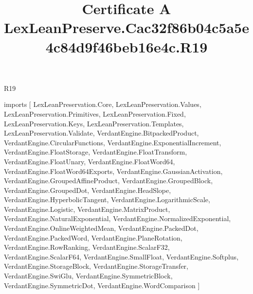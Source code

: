 \begin{lexlean}{R19}
\title{Certificate A LexLeanPreserve.Cac32f86b04c5a5e4c84d9f46beb16e4c.R19}
\begin{coremodule}
imports [
  LexLeanPreservation.Core,
  LexLeanPreservation.Values,
  LexLeanPreservation.Primitives,
  LexLeanPreservation.Fixed,
  LexLeanPreservation.Keys,
  LexLeanPreservation.Templates,
  LexLeanPreservation.Validate,
  VerdantEngine.BitpackedProduct,
  VerdantEngine.CircularFunctions,
  VerdantEngine.ExponentialIncrement,
  VerdantEngine.FloatStorage,
  VerdantEngine.FloatTransform,
  VerdantEngine.FloatUnary,
  VerdantEngine.FloatWord64,
  VerdantEngine.FloatWord64Exports,
  VerdantEngine.GaussianActivation,
  VerdantEngine.GroupedAffineProduct,
  VerdantEngine.GroupedBlock,
  VerdantEngine.GroupedDot,
  VerdantEngine.HeadSlope,
  VerdantEngine.HyperbolicTangent,
  VerdantEngine.LogarithmicScale,
  VerdantEngine.Logistic,
  VerdantEngine.MatrixProduct,
  VerdantEngine.NaturalExponential,
  VerdantEngine.NormalizedExponential,
  VerdantEngine.OnlineWeightedMean,
  VerdantEngine.PackedDot,
  VerdantEngine.PackedWord,
  VerdantEngine.PlaneRotation,
  VerdantEngine.RowRanking,
  VerdantEngine.ScalarF32,
  VerdantEngine.ScalarF64,
  VerdantEngine.SmallFloat,
  VerdantEngine.Softplus,
  VerdantEngine.StorageBlock,
  VerdantEngine.StorageTransfer,
  VerdantEngine.SwiGlu,
  VerdantEngine.SymmetricBlock,
  VerdantEngine.SymmetricDot,
  VerdantEngine.WordComparison
]


\end{coremodule}
\end{lexlean}
